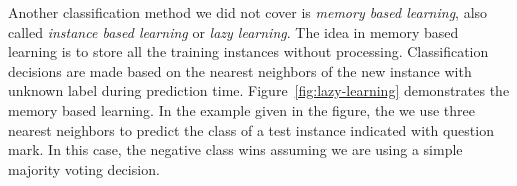 Another classification method we did not cover is
\emph{memory based learning},
also called \emph{instance based learning} or \emph{lazy learning}.
The idea in memory based learning is
to store all the training instances without processing.
Classification decisions are made based on the 
nearest neighbors of the new instance with unknown label
during prediction time.
Figure~\ref{fig:lazy-learning} demonstrates
the memory based learning.
In the example given in the figure,
the we use three nearest neighbors
to predict the class of a test instance indicated with question mark.
In this case, 
the negative class wins assuming we are using a simple majority voting decision. 
\begin{marginfigure}
  \centering
    \caption{\label{fig:lazy-learning}%
      A demonstration of the memory-based learning.
    }
\end{marginfigure}

